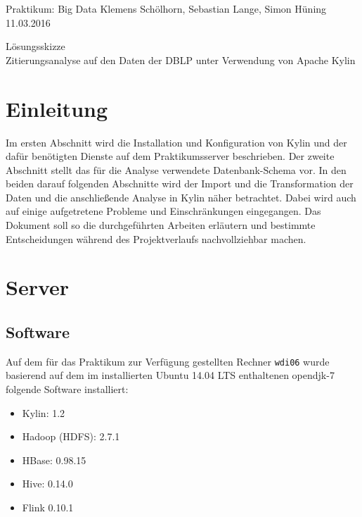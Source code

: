 \documentclass[a4paper,11pt,utf8]{scrartcl}
\begin{document}
\pagestyle{empty}

\noindent
Praktikum: Big Data \hfill Klemens Schölhorn, Sebastian Lange, Simon Hüning \hfill 11.03.2016\vspace{-.4cm}\\
\begin{center}
\huge\textsf{Lösungsskizze}\vspace{.1cm}\\
\large Zitierungsanalyse auf den Daten der DBLP unter Verwendung von Apache Kylin
\end{center}

\section*{Einleitung}

Im ersten Abschnitt wird die Installation und Konfiguration von Kylin und der dafür benötigten Dienste auf dem Praktikumsserver beschrieben. Der zweite Abschnitt stellt das für die Analyse verwendete Datenbank-Schema vor. In den beiden darauf folgenden Abschnitte wird der Import und die Transformation der Daten und die anschließende Analyse in Kylin näher betrachtet. Dabei wird auch auf einige aufgetretene Probleme und Einschränkungen eingegangen. Das Dokument soll so die durchgeführten Arbeiten erläutern und bestimmte Entscheidungen während des Projektverlaufs nachvollziehbar machen.

\section{Server}

\subsection{Software}

Auf dem für das Praktikum zur Verfügung gestellten Rechner \texttt{wdi06} wurde basierend auf dem im installierten Ubuntu 14.04 LTS enthaltenen opendjk-7 folgende Software installiert:

\begin{itemize}
    \item Kylin: 1.2
    \item Hadoop (HDFS): 2.7.1
    \item HBase: 0.98.15
    \item Hive: 0.14.0
    \item Flink 0.10.1
\end{itemize}
\end{document}
